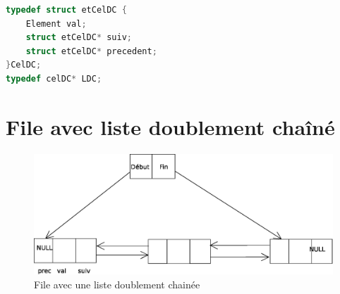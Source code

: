 \begin{lstlisting}[language=C, numbers=none,frame=none, caption=Structure \texttt{CelDC} -- Pile avec liste doublement chaînée]
typedef struct etCelDC {
	Element val;
	struct etCelDC* suiv;
	struct etCelDC* precedent;
}CelDC;
typedef celDC* LDC;
\end{lstlisting}

\section{File avec liste doublement chaîné}
\begin{figure}[H]
	\centering
\includegraphics[width=12cm]{content/fileDoubleChaine.eps}
	\caption{File avec une liste doublement chainée}
\end{figure}
